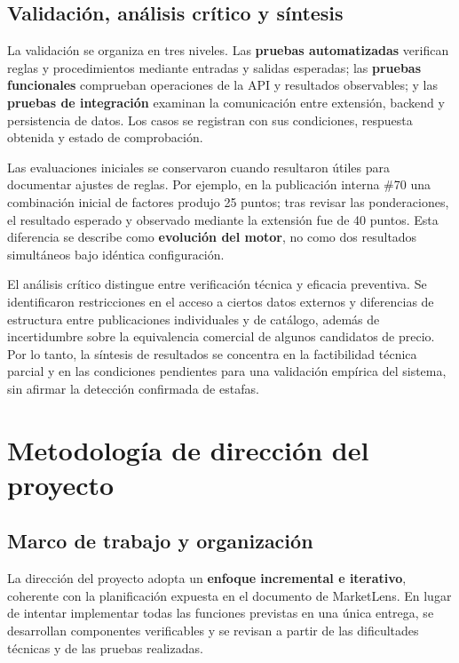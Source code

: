 \subsection{Validación, análisis crítico y síntesis}\label{subsec:ml-validacion}

La validación se organiza en tres niveles. Las \textbf{pruebas automatizadas} verifican reglas y procedimientos mediante entradas y salidas esperadas; las \textbf{pruebas funcionales} comprueban operaciones de la API y resultados observables; y las \textbf{pruebas de integración} examinan la comunicación entre extensión, backend y persistencia de datos. Los casos se registran con sus condiciones, respuesta obtenida y estado de comprobación.

Las evaluaciones iniciales se conservaron cuando resultaron útiles para documentar ajustes de reglas. Por ejemplo, en la publicación interna \#70 una combinación inicial de factores produjo 25 puntos; tras revisar las ponderaciones, el resultado esperado y observado mediante la extensión fue de 40 puntos. Esta diferencia se describe como \textbf{evolución del motor}, no como dos resultados simultáneos bajo idéntica configuración.

El análisis crítico distingue entre verificación técnica y eficacia preventiva. Se identificaron restricciones en el acceso a ciertos datos externos y diferencias de estructura entre publicaciones individuales y de catálogo, además de incertidumbre sobre la equivalencia comercial de algunos candidatos de precio. Por lo tanto, la síntesis de resultados se concentra en la factibilidad técnica parcial y en las condiciones pendientes para una validación empírica del sistema, sin afirmar la detección confirmada de estafas.



\section{Metodología de dirección del proyecto}\label{sec:ml-direccion-proyecto}

\subsection{Marco de trabajo y organización}\label{subsec:ml-marco-gestion}

La dirección del proyecto adopta un \textbf{enfoque incremental e iterativo}, coherente con la planificación expuesta en el documento de MarketLens. En lugar de intentar implementar todas las funciones previstas en una única entrega, se desarrollan componentes verificables y se revisan a partir de las dificultades técnicas y de las pruebas realizadas.

